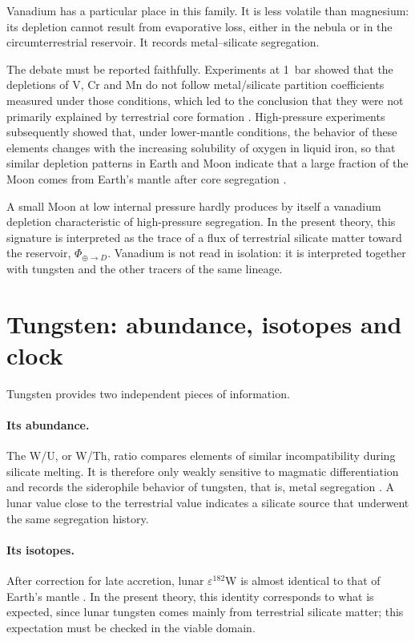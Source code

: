 \documentclass[11pt,a4paper,openany]{report}
\begin{document}
Vanadium has a particular place in this family. It is less volatile than magnesium: its depletion
cannot result from evaporative loss, either in the nebula or in the circumterrestrial reservoir. It
records metal--silicate segregation.

The debate must be reported faithfully. Experiments at 1~bar showed that the depletions of V, Cr
and Mn do not follow metal/silicate partition coefficients measured under those conditions, which
led to the conclusion that they were not primarily explained by terrestrial core formation
\cite{Drake1989}. High-pressure experiments subsequently showed that, under lower-mantle
conditions, the behavior of these elements changes with the increasing solubility of oxygen in
liquid iron, so that similar depletion patterns in Earth and Moon indicate that a large fraction of
the Moon comes from Earth's mantle after core segregation \cite{Ringwood1990,GessmannRubie2000}.

\begin{lecture}
A small Moon at low internal pressure hardly produces by itself a vanadium depletion characteristic
of high-pressure segregation. In the present theory, this signature is interpreted as the trace of
a flux of terrestrial silicate matter toward the reservoir, $\Phi_{\oplus\to D}$. Vanadium is not
read in isolation: it is interpreted together with tungsten and the other tracers of the same
lineage.
\end{lecture}

\section{Tungsten: abundance, isotopes and clock}

Tungsten provides two independent pieces of information.

\paragraph{Its abundance.}
The W/U, or W/Th, ratio compares elements of similar incompatibility during silicate melting. It is
therefore only weakly sensitive to magmatic differentiation and records the siderophile behavior of
tungsten, that is, metal segregation \cite{Newsom1986}. A lunar value close to the terrestrial
value indicates a silicate source that underwent the same segregation history.

\paragraph{Its isotopes.}
After correction for late accretion, lunar $\varepsilon^{182}$W is almost identical to that of
Earth's mantle \cite{Kruijer2015,Touboul2015}. In the present theory, this identity corresponds to
what is expected, since lunar tungsten comes mainly from terrestrial silicate matter; this
expectation must be checked in the viable domain.
\end{document}
